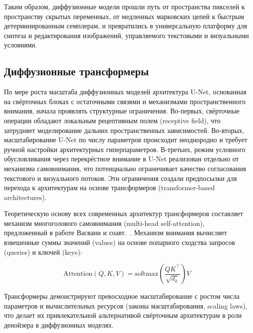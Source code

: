 Таким образом, диффузионные модели прошли путь от пространства пикселей к пространству скрытых переменных, от медленных марковских цепей к быстрым детерминированным семплерам, и превратились в универсальную платформу для синтеза и редактирования изображений, управляемого текстовыми и визуальными условиями.


\subsection{Диффузионные трансформеры}

По мере роста масштаба диффузионных моделей архитектура U-Net, основанная на свёрточных блоках с остаточными связями и механизмами пространственного внимания, начала проявлять структурные ограничения. Во-первых, свёрточные операции обладают локальным рецептивным полем (receptive field), что затрудняет моделирование дальних пространственных зависимостей. Во-вторых, масштабирование U-Net по числу параметров происходит неоднородно и требует ручной настройки архитектурных гиперпараметров. В-третьих, режим условного обусловливания через перекрёстное внимание в U-Net реализован отдельно от механизма самовнимания, что потенциально ограничивает качество согласования текстового и визуального потоков. Эти ограничения создали предпосылки для перехода к архитектурам на основе трансформеров (transformer-based architectures).

Теоретическую основу всех современных архитектур трансформеров составляет механизм многоголового самовнимания (multi-head self-attention), предложенный в работе Васвани и соавт.~\cite{vaswani2017attention}. Механизм внимания вычисляет взвешенные суммы значений (values) на основе попарного сходства запросов (queries) и ключей (keys):

\begin{equation}
    \text{Attention}(Q, K, V) = \text{softmax}\!\left(\frac{QK^\top}{\sqrt{d_k}}\right) V
    \label{eq:attention}
\end{equation}

Трансформеры демонстрируют превосходное масштабирование с ростом числа параметров и вычислительных ресурсов (законы масштабирования, scaling laws), что делает их привлекательной альтернативой свёрточным архитектурам в роли денойзера в диффузионных моделях.


